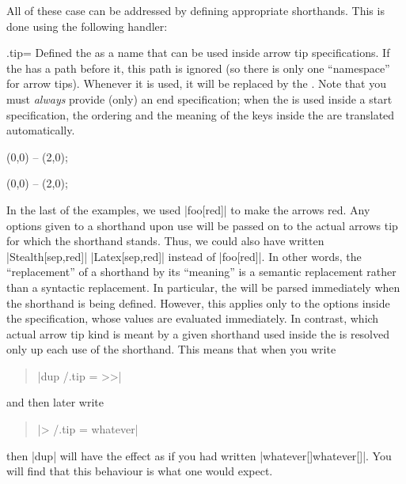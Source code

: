 All of these case can be addressed by defining appropriate shorthands. This is
done using the following handler:

\begin{handler}{{.tip}{=}}
    Defined the  as a name that can be used inside arrow tip
    specifications. If the  has a path before it, this path is
    ignored (so there is only one ``namespace'' for arrow tips). Whenever it is
    used, it will be replaced by the . Note that you
    must \emph{always} provide (only) an end specification; when the 
    is used inside a start specification, the ordering and the meaning of the
    keys inside the  are translated automatically.
\begin{codeexample}[]
\tikz [foo /.tip = {Stealth[sep]. >>}]
  \draw [-foo] (0,0) -- (2,0);
\end{codeexample}
\begin{codeexample}[]
\tikz [foo /.tip = {Stealth[sep] Latex[sep]},
       bar /.tip = {Stealth[length=10pt,open]}]
   (0,0) -- (2,0);
\end{codeexample}

    In the last of the examples, we used |foo[red]| to make the arrows red. Any
    options given to a shorthand upon use will be passed on to the actual
    arrows tip for which the shorthand stands. Thus, we could also have written
    |Stealth[sep,red]| |Latex[sep,red]| instead of |foo[red]|. In other words,
    the ``replacement'' of a shorthand by its ``meaning'' is a semantic
    replacement rather than a syntactic replacement. In particular, the
     will be parsed immediately when the shorthand is
    being defined. However, this applies only to the options inside the
    specification, whose values are evaluated immediately. In contrast, which
    actual arrow tip kind is meant by a given shorthand used inside the
     is resolved only up each use of the shorthand.
    This means that when you write
    \begin{quote}
        |dup /.tip = >>|
    \end{quote}
    and then later write
    \begin{quote}
        |> /.tip = whatever|
    \end{quote}
    then |dup| will have the effect as if you had written
    |whatever[]whatever[]|. You will find that this behaviour is what one would
    expect.


\end{handler}

